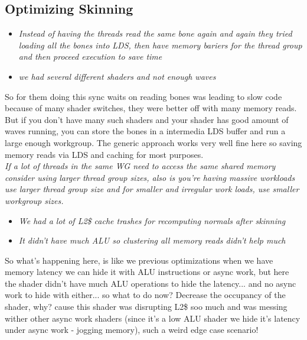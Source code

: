 \documentclass[14pt]{article}
\begin{document}
\subsection*{Optimizing Skinning}

\begin{itemize}
	\item \textit{Instead of having the threads read the same bone again and again they tried loading  all the bones into LDS, then have memory bariers for the thread group and then proceed execution to save time}
	
	\item \textit{we had several different shaders and not enough waves}
\end{itemize}

So for them doing this sync waits on reading bones was leading to slow code because of many shader switches, they were better off with many memory reads. But if you don't have many such shaders and your shader has good amount of waves running, you can store the bones in a intermedia LDS buffer and run a large enough workgroup. The generic approach works very well fine here so saving memory reads via LDS and caching for most purposes. \\

\textit{If a lot of threads in the same WG need to access the same shared memory consider using larger thread group sizes, also is you're having massive workloads use larger thread group size and for smaller and irregular work loads, use smaller workgroup sizes.} \\


\begin{itemize}
	\item \textit{We had a lot of L2\$ cache trashes for recomputing normals after skinning}
	
	\item \textit{It didn't have much ALU so clustering all memory reads didn't help much}
\end{itemize}

So what's happening here, is like we previous optimizations when we have memory latency we can hide it with ALU instructions or async work, but here the shader didn't have much ALU operations to hide the latency... and no async work to hide with either... so what to do now? Decrease the occupancy of the shader, why? cause this shader was disrupting L2\$ soo much and was messing wither other async work shaders (since it's a low ALU shader we hide it's latency under async work - jogging memory), such a weird edge case scenario!
\end{document}
